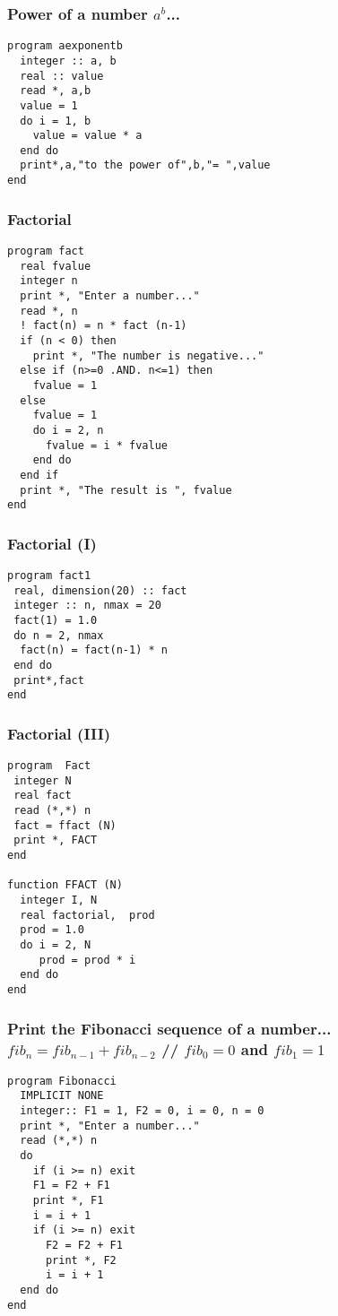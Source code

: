 \documentclass[xcolor=dvipsnames,dvip,notes=show,table]{beamer}
\begin{document}
\begin{frame}[fragile]
\frametitle{Power of a number $a^b$...}

\scriptsize
\begin{lstlisting}
program aexponentb
  integer :: a, b
  real :: value
  read *, a,b
  value = 1
  do i = 1, b
    value = value * a
  end do
  print*,a,"to the power of",b,"= ",value
end
\end{lstlisting}
\end{frame}



\begin{frame}[fragile]
\frametitle{Factorial}
\scriptsize
\begin{lstlisting}
program fact
  real fvalue
  integer n
  print *, "Enter a number..."
  read *, n
  ! fact(n) = n * fact (n-1)
  if (n < 0) then 
    print *, "The number is negative..."
  else if (n>=0 .AND. n<=1) then
    fvalue = 1
  else
    fvalue = 1
    do i = 2, n
      fvalue = i * fvalue
    end do
  end if
  print *, "The result is ", fvalue
end
\end{lstlisting}
\end{frame}



\begin{frame}[fragile]
\frametitle{Factorial (I)}

\scriptsize
\begin{lstlisting}
program fact1
 real, dimension(20) :: fact
 integer :: n, nmax = 20
 fact(1) = 1.0
 do n = 2, nmax
  fact(n) = fact(n-1) * n
 end do
 print*,fact
end
\end{lstlisting}
\end{frame}




\begin{frame}[fragile]
\frametitle{Factorial (III)}

\scriptsize
\begin{lstlisting}
program  Fact 
 integer N 
 real fact
 read (*,*) n 
 fact = ffact (N) 
 print *, FACT 
end

function FFACT (N) 
  integer I, N 
  real factorial,  prod
  prod = 1.0 
  do i = 2, N 
     prod = prod * i 
  end do 
end
\end{lstlisting}
\end{frame}



\begin{frame}[fragile]
\frametitle{Print the Fibonacci sequence of a number... $fib_n=fib_{n-1}+fib_{n-2}$ // $fib_0 = 0$ and $fib_1 = 1$}

\scriptsize
\begin{lstlisting}
program Fibonacci
  IMPLICIT NONE
  integer:: F1 = 1, F2 = 0, i = 0, n = 0
  print *, "Enter a number..."
  read (*,*) n
  do 
    if (i >= n) exit
    F1 = F2 + F1
    print *, F1
    i = i + 1
    if (i >= n) exit
      F2 = F2 + F1
      print *, F2
      i = i + 1
  end do
end
\end{lstlisting}
\end{frame}


\frame{
\titlepage

}


\end{document}
